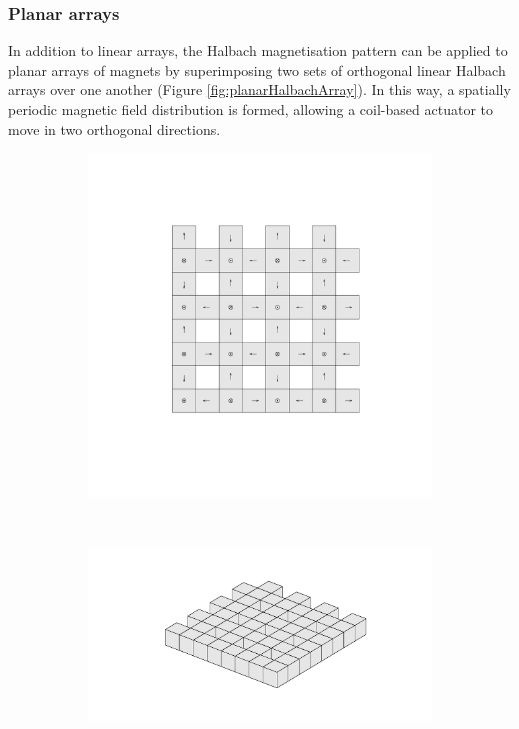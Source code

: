 \subsubsection*{Planar arrays}
In addition to linear arrays, the Halbach magnetisation pattern can be applied to planar arrays of magnets by superimposing two sets of orthogonal linear Halbach arrays over one another (Figure \ref{fig:planarHalbachArray}). In this way, a spatially periodic magnetic field distribution is formed, allowing a coil-based actuator to move in two orthogonal directions.
\begin{figure}
    \centering
    \begin{subfigure}{\linewidth}
        \centering
        \includegraphics[width=\linewidth]{images/cuboidPlanarArraypdf.pdf}
        \vspace{-30mm}\subcaption{}
    \end{subfigure} \\
    \begin{subfigure}{\linewidth}
        \centering
        \includegraphics[width=\linewidth]{images/cuboidPlanarArrayAngledpdf.pdf}

\end{subfigure}
\end{figure}
